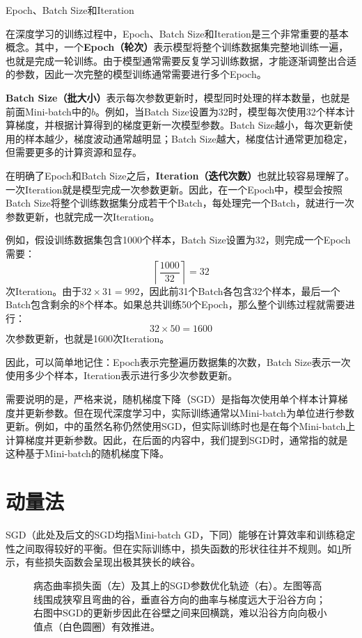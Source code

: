 \begin{purpleBox}{Epoch、Batch Size和Iteration}

在深度学习的训练过程中，Epoch、Batch Size和Iteration是三个非常重要的基本概念。其中，一个\textbf{Epoch（轮次）}表示模型将整个训练数据集完整地训练一遍，也就是完成一轮训练。由于模型通常需要反复学习训练数据，才能逐渐调整出合适的参数，因此一次完整的模型训练通常需要进行多个Epoch。

\textbf{Batch Size（批大小）}表示每次参数更新时，模型同时处理的样本数量，也就是前面Mini-batch中的$b$。例如，当Batch Size设置为32时，模型每次使用32个样本计算梯度，并根据计算得到的梯度更新一次模型参数。Batch Size越小，每次更新使用的样本越少，梯度波动通常越明显；Batch Size越大，梯度估计通常更加稳定，但需要更多的计算资源和显存。

在明确了Epoch和Batch Size之后，\textbf{Iteration（迭代次数）}也就比较容易理解了。一次Iteration就是模型完成一次参数更新。因此，在一个Epoch中，模型会按照Batch Size将整个训练数据集分成若干个Batch，每处理完一个Batch，就进行一次参数更新，也就完成一次Iteration。

例如，假设训练数据集包含1000个样本，Batch Size设置为32，则完成一个Epoch需要：
$$
\left\lceil\frac{1000}{32}\right\rceil=32
$$
次Iteration。由于$32\times31=992$，因此前31个Batch各包含32个样本，最后一个Batch包含剩余的8个样本。如果总共训练50个Epoch，那么整个训练过程就需要进行：
$$
32\times50=1600
$$
次参数更新，也就是1600次Iteration。

因此，可以简单地记住：Epoch表示完整遍历数据集的次数，Batch Size表示一次使用多少个样本，Iteration表示进行多少次参数更新。
\end{purpleBox}

需要说明的是，严格来说，随机梯度下降（SGD）是指每次使用单个样本计算梯度并更新参数。但在现代深度学习中，实际训练通常以Mini-batch为单位进行参数更新。例如，中的虽然名称仍然使用SGD，但实际训练时也是在每个Mini-batch上计算梯度并更新参数。因此，在后面的内容中，我们提到SGD时，通常指的就是这种基于Mini-batch的随机梯度下降。

\section{动量法}

SGD（此处及后文的SGD均指Mini-batch GD，下同）能够在计算效率和训练稳定性之间取得较好的平衡。但在实际训练中，损失函数的形状往往并不规则。如\cref{fig:ill_conditioned}所示，有些损失函数会呈现出极其狭长的峡谷。

\begin{figure}[H]
    \caption{病态曲率损失面（左）及其上的SGD参数优化轨迹（右）。左图等高线围成狭窄且弯曲的谷，垂直谷方向的曲率与梯度远大于沿谷方向；右图中SGD的更新步因此在谷壁之间来回横跳，难以沿谷方向向极小值点（白色圆圈）有效推进。}
    \label{fig:ill_conditioned}
\end{figure}

